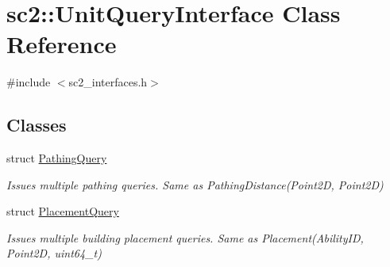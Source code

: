 \hypertarget{classsc2_1_1_unit_query_interface}{}\section{sc2\+:\+:Unit\+Query\+Interface Class Reference}
\label{classsc2_1_1_unit_query_interface}


{\ttfamily \#include $<$sc2\+\_\+interfaces.\+h$>$}

\subsection*{Classes}
\begin{DoxyCompactItemize}
\item 
struct \hyperlink{structsc2_1_1_unit_query_interface_1_1_pathing_query}{Pathing\+Query}
\begin{DoxyCompactList}\small\item\em Issues multiple pathing queries. Same as Pathing\+Distance(\+Point2\+D, Point2\+D) \end{DoxyCompactList}\item 
struct \hyperlink{structsc2_1_1_unit_query_interface_1_1_placement_query}{Placement\+Query}
\begin{DoxyCompactList}\small\item\em Issues multiple building placement queries. Same as Placement(\+Ability\+I\+D, Point2\+D, uint64\+\_\+t) \end{DoxyCompactList}\end{DoxyCompactItemize}
